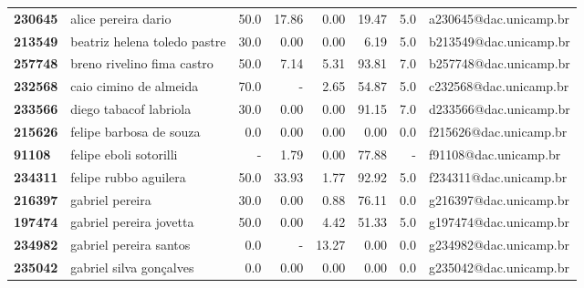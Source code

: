 \documentclass[11pt]{article}
\begin{document}
\begin{center}
\begin{landscape}
\begin{longtable}{llrrrrrl}
\bottomrule
\endlastfoot
\textbf{230645} &                    alice pereira dario &                  50.0 &       17.86 &        0.00 &       19.47 &                      5.0 &  a230645@dac.unicamp.br \\
\textbf{213549} &           beatriz helena toledo pastre &                  30.0 &        0.00 &        0.00 &        6.19 &                      5.0 &  b213549@dac.unicamp.br \\
\textbf{257748} &             breno rivelino fima castro &                  50.0 &        7.14 &        5.31 &       93.81 &                      7.0 &  b257748@dac.unicamp.br \\
\textbf{232568} &                 caio cimino de almeida &                  70.0 &           - &        2.65 &       54.87 &                      5.0 &  c232568@dac.unicamp.br \\
\textbf{233566} &                 diego tabacof labriola &                  30.0 &        0.00 &        0.00 &       91.15 &                      7.0 &  d233566@dac.unicamp.br \\
\textbf{215626} &                felipe barbosa de souza &                   0.0 &        0.00 &        0.00 &        0.00 &                      0.0 &  f215626@dac.unicamp.br \\
\textbf{91108 } &                 felipe eboli sotorilli &                     - &        1.79 &        0.00 &       77.88 &                        - &   f91108@dac.unicamp.br \\
\textbf{234311} &                  felipe rubbo aguilera &                  50.0 &       33.93 &        1.77 &       92.92 &                      5.0 &  f234311@dac.unicamp.br \\
\textbf{216397} &                        gabriel pereira &                  30.0 &        0.00 &        0.88 &       76.11 &                      0.0 &  g216397@dac.unicamp.br \\
\textbf{197474} &                gabriel pereira jovetta &                  50.0 &        0.00 &        4.42 &       51.33 &                      5.0 &  g197474@dac.unicamp.br \\
\textbf{234982} &                 gabriel pereira santos &                   0.0 &           - &       13.27 &        0.00 &                      0.0 &  g234982@dac.unicamp.br \\
\textbf{235042} &                gabriel silva gonçalves &                   0.0 &        0.00 &        0.00 &        0.00 &                      0.0 &  g235042@dac.unicamp.br \\

\end{longtable}
\end{landscape}
\end{center}
\end{document}
